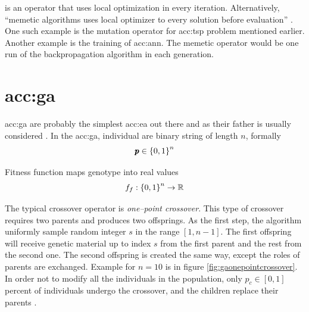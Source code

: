 is an operator that uses local optimization in every iteration. Alternatively, \enquote{memetic algorithms uses local optimizer to every solution before evaluation} \citep{HowToSolveItModernHeuristics}. One such example is the mutation operator for \acrlong{acc:tsp} problem mentioned earlier. Another example is the training of \acrshort{acc:ann}. The memetic operator would be one run of the backpropagation algorithm in each generation.




\section{\texorpdfstring{\acrlong*{acc:ga}}{Genetic Algorithms}}

\acrfull{acc:ga} are probably the simplest \acrfull{acc:ea} out there and as their father is usually considered . In the \acrshort{acc:ga}, individual are binary string of length $n$, formally
$$ \pmb{p} \in \left\{0,1\right\}^{n} $$

Fitness function maps genotype into real values
$$ f_f:\left\{0,1\right\}^{n}\rightarrow\mathbb{R} $$

The typical crossover operator is \emph{one--point crossover}. This type of crossover requires two parents and produces two offsprings. As the first step, the algorithm uniformly sample random integer $s$ in the range $\left[ 1, n-1 \right]$. The first offspring will receive genetic material up to index $s$ from the first parent and the rest from the second one. The second offspring is created the same way, except the roles of parents are exchanged. Example for $n=10$ is in figure \ref{fig:gaonepointcrossover}. In order not to modify all the individuals in the population, only $p_c\in\left[0,1\right]$ percent of individuals undergo the crossover, and the children replace their parents \citep{IntroductionToEA}.

